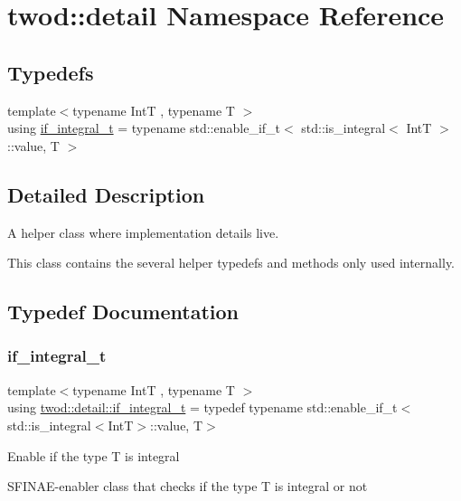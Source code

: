 \hypertarget{namespacetwod_1_1detail}{}\section{twod\+:\+:detail Namespace Reference}
\label{namespacetwod_1_1detail}
\subsection*{Typedefs}
\begin{DoxyCompactItemize}
\item 
{\footnotesize template$<$typename IntT , typename T $>$ }\\using \hyperlink{namespacetwod_1_1detail_a594c4b9cf396490f0ca5a324b0ef66db}{if\+\_\+integral\+\_\+t} = typename std\+::enable\+\_\+if\+\_\+t$<$ std\+::is\+\_\+integral$<$ IntT $>$\+::value, T $>$
\end{DoxyCompactItemize}


\subsection{Detailed Description}
A helper class where implementation details live.

This class contains the several helper typedefs and methods only used internally. 

\subsection{Typedef Documentation}
\mbox{\label{namespacetwod_1_1detail_a594c4b9cf396490f0ca5a324b0ef66db}} 
\subsubsection{\texorpdfstring{if\+\_\+integral\+\_\+t}{if\_integral\_t}}
{\footnotesize\ttfamily template$<$typename IntT , typename T $>$ \\
using \hyperlink{namespacetwod_1_1detail_a594c4b9cf396490f0ca5a324b0ef66db}{twod\+::detail\+::if\+\_\+integral\+\_\+t} = typedef typename std\+::enable\+\_\+if\+\_\+t$<$std\+::is\+\_\+integral$<$IntT$>$\+::value, T$>$}

Enable if the type T is integral

S\+F\+I\+N\+A\+E-\/enabler class that checks if the type T is integral or not 